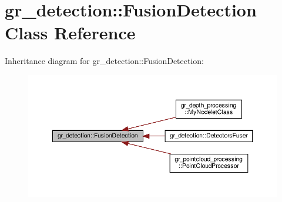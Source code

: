 \hypertarget{classgr__detection_1_1FusionDetection}{}\section{gr\+\_\+detection\+:\+:Fusion\+Detection Class Reference}
\label{classgr__detection_1_1FusionDetection}


Inheritance diagram for gr\+\_\+detection\+:\+:Fusion\+Detection\+:
\nopagebreak
\begin{figure}[H]
\begin{center}
\leavevmode
\includegraphics[width=350pt]{classgr__detection_1_1FusionDetection__inherit__graph}
\end{center}
\end{figure}
